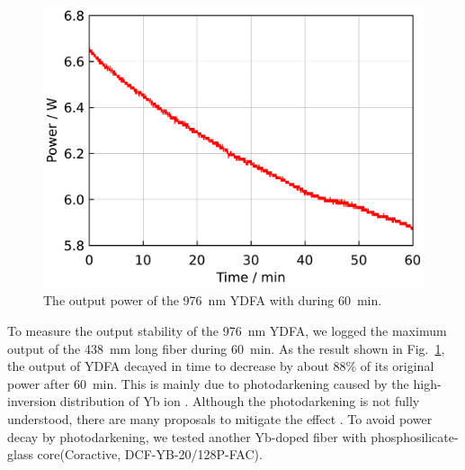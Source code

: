 \documentclass{osa-article}
\begin{document}
\begin{figure}[h!]
  \centering
  \begin{minipage}[b]{0.5\linewidth}
    \centering
    \includegraphics[keepaspectratio, width=0.9\linewidth]{./Figure/Yb1200-20-125DC-PM438mm_LongTermStability_915Pump70W976Seed0.24W_Exp}
  \end{minipage}
  \caption{The output power of the \SI{976}{\nm} YDFA with during \SI{60}{\minute}.}
  \label{fig:LongTermStabilityOfNLIGHT976YDFA}
\end{figure}
To measure the output stability of the \SI{976}{nm} YDFA, we logged the maximum output of the \SI{438}{mm} long fiber during \SI{60}{\minute}.
As the result shown in Fig.~\ref{fig:LongTermStabilityOfNLIGHT976YDFA}, the output of YDFA decayed in time to decrease by about 88\% of its original power after \SI{60}{\minute}.
This is mainly due to photodarkening caused by the high-inversion distribution of Yb ion \cite{paschotta1997Lifetime}.
Although the photodarkening is not fully understood, there are many proposals to mitigate the effect \cite{manek-honninger2007Photodarkening, zhao2019Elimination, engholm2008Preventing}.
To avoid power decay by photodarkening, we tested another Yb-doped fiber with phosphosilicate-glass core(Coractive, DCF-YB-20/128P-FAC).
\end{document}
